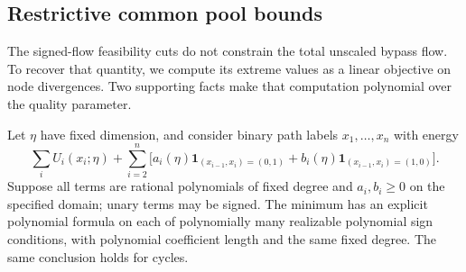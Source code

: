 \subsection{Restrictive common pool bounds}\label{s5:common-capacity}

The signed-flow feasibility cuts do not constrain the total unscaled
bypass flow. To recover that quantity, we compute its extreme values
as a linear objective on node divergences. Two supporting facts make
that computation polynomial over the quality parameter.

\begin{lemma}
\label{s5:clamp}
Let $\eta$ have fixed dimension, and consider binary path labels
$x_1,\ldots,x_n$ with energy
\[
 \sum_iU_i(x_i;\eta)+\sum_{i=2}^n
 \bigl[a_i(\eta)\mathbf1_{(x_{i-1},x_i)=(0,1)}+
       b_i(\eta)\mathbf1_{(x_{i-1},x_i)=(1,0)}\bigr].
\]
Suppose all terms are rational polynomials of fixed degree and
$a_i,b_i\ge0$ on the specified domain; unary terms may be signed.
The minimum has an explicit polynomial formula on each of polynomially
many realizable polynomial sign conditions, with polynomial coefficient
length and the same fixed degree. The same conclusion holds for cycles.
\end{lemma}
